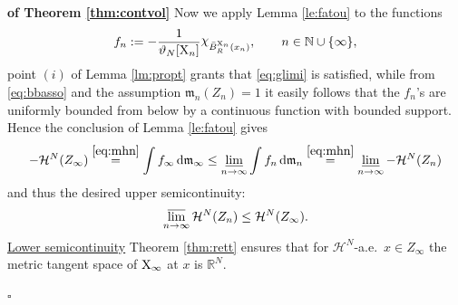 \documentclass[reqno,11pt]{article}
\numberwithin{equation}{section}
\newcommand{\N}{\mathbb{N}}
\newcommand{\R}{\mathbb{R}}
\newcommand{\mm}{{\mbox{\boldmath$m$}}}
\renewcommand{\d}{{\mathrm d}}
\newcommand{\nchi}{{\raise.3ex\hbox{$\chi$}}}
\newcommand{\limi}{\varliminf}
\newcommand{\lims}{\varlimsup}
\renewcommand{\mm}{\mathfrak m}                                %
\newenvironment{proofb}{\removelastskip\par\medskip   %
\noindent{\em{\bf Proof}} \rm}{\penalty-20\null\hfill$\square$\par\medbreak}
\newcommand{\X}{{\rm X}}
\newcommand{\HH}{{\mathcal H}}
\begin{document}
\begin{proofb}{\bf of Theorem \ref{thm:contvol}}
Now we apply Lemma \ref{le:fatou} to the functions 
\[
f_n:=-\frac1{\vartheta_N[\X_n]}\nchi_{\bar B_R^{\X_n}(x_n)},\qquad n\in\N\cup\{\infty\},
\]
 point $(i)$ of Lemma \ref{lm:propt} grants that \eqref{eq:glimi} is satisfied, while from \eqref{eq:bbasso} and the assumption $\mm_n(Z_n)=1$ it easily follows that the $f_n$'s are uniformly bounded from below by a continuous function with bounded support. Hence the conclusion of Lemma \ref{le:fatou} gives
\[
-\HH^N(Z_\infty)\stackrel{\eqref{eq:mhn}}=\int f_\infty\,\d\mm_\infty\leq\limi_{n\to\infty}\int f_n\,\d\mm_n\stackrel{\eqref{eq:mhn}}=\limi_{n\to\infty}-\HH^N(Z_n)
\]
and thus the desired upper semicontinuity:
\[
\lims_{n\to\infty}\HH^N(Z_n)\le \HH^N(Z_\infty).
\]
\noindent\underline{Lower semicontinuity} Theorem \ref{thm:rett} ensures that for $\HH^N$-a.e.\ $x\in Z_\infty$ the metric tangent space of $\X_\infty$ at $x$ is $\R^N$.


\end{proofb}
\end{document}
